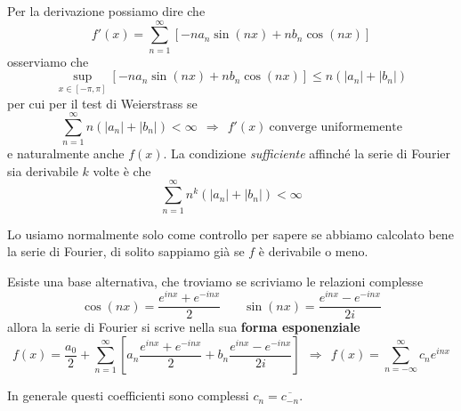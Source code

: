 \begin{thm}
[Derivazione] Per la derivazione possiamo dire che
\begin{equation*}
f'( x) =\sum\limits ^{\infty }_{n=1}[ -na_{n}\sin( nx) +nb_{n}\cos( nx)]
\end{equation*}
osserviamo che
\begin{equation*}
\sup _{x\in [ -\pi ,\pi ]}[ -na_{n}\sin( nx) +nb_{n}\cos( nx)] \leqslant n(| a_{n}| +| b_{n}| )
\end{equation*}
per cui per il test di Weierstrass se
\begin{equation*}
\sum\limits ^{\infty }_{n=1} n(| a_{n}| +| b_{n}| ) < \infty \ \ \Rightarrow \ \ f'( x) \ \text{converge uniformemente}
\end{equation*}
e naturalmente anche $f( x)$. La condizione \textit{sufficiente} affinché la serie di Fourier sia derivabile $k$ volte è che
\begin{equation*}
\sum\limits ^{\infty }_{n=1} n^{k}(| a_{n}| +| b_{n}| ) < \infty 
\end{equation*}
\end{thm}
\begin{rem}
Lo usiamo normalmente solo come controllo per sapere se abbiamo calcolato bene la serie di Fourier, di solito sappiamo già se $f$ è derivabile o meno.
\end{rem}
Esiste una base alternativa, che troviamo se scriviamo le relazioni complesse
\begin{equation*}
\cos( nx) =\frac{e^{inx} +e^{-inx}}{2} \ \ \ \ \ \ \ \ \sin( nx) =\frac{e^{inx} -e^{-inx}}{2i}
\end{equation*}
allora la serie di Fourier si scrive nella sua \textbf{forma esponenziale}
\begin{equation*}
f( x) =\frac{a_{0}}{2} +\sum\limits ^{\infty }_{n=1}\left[ a_{n}\frac{e^{inx} +e^{-inx}}{2} +b_{n}\frac{e^{inx} -e^{-inx}}{2i}\right] \ \ \Rightarrow \ \ \boxed{f( x) =\sum\limits ^{\infty }_{n=-\infty } c_{n} e^{inx}}
\end{equation*}
\begin{rem}
In generale questi coefficienti sono complessi $c_{n} =\overline{c_{-n}}$.
\end{rem}
